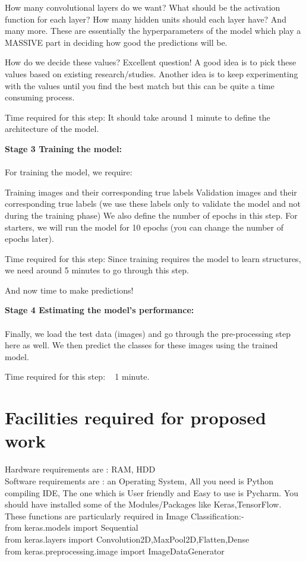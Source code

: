 \documentclass{article}
\begin{document}
How many convolutional layers do we want?
What should be the activation function for each layer?
How many hidden units should each layer have?
And many more. These are essentially the hyperparameters of the model which play a MASSIVE part in deciding how good the predictions will be.

How do we decide these values? Excellent question! A good idea is to pick these values based on existing research/studies. Another idea is to keep experimenting with the values until you find the best match but this can be quite a time consuming process.

Time required for this step: It should take around 1 minute to define the architecture of the model.

\textbf {{\Large Stage 3 Training the model:}}\\
\\For training the model, we require:

Training images and their corresponding true labels
Validation images and their corresponding true labels (we use these labels only to validate the model and not during the training phase)
We also define the number of epochs in this step. For starters, we will run the model for 10 epochs (you can change the number of epochs later).

Time required for this step: Since training requires the model to learn structures, we need around 5 minutes to go through this step.

And now time to make predictions!

\textbf {{\Large  Stage 4 Estimating the model’s performance:}}\\
\\Finally, we load the test data (images) and go through the pre-processing step here as well. We then predict the classes for these images using the trained model.

Time required for this step: ~ 1 minute.

\section{ Facilities required for proposed work}
Hardware requirements are : RAM, HDD\\ 
Software requirements are : 
an Operating System,
All you need is Python compiling IDE,
The one which is User friendly and Easy to use is Pycharm.
You should have installed some of the Modules/Packages like
Keras,TensorFlow.
These functions are particularly required in Image Classification:-\\
from keras.models import Sequential\\
from keras.layers import Convolution2D,MaxPool2D,Flatten,Dense\\
from keras.preprocessing.image import ImageDataGenerator\\
\end{document}
